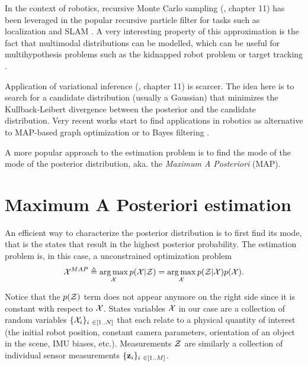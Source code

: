 In the context of robotics, recursive Monte Carlo sampling (\cite{koller2009probabilistic}, chapter 11) has been 
leveraged in the popular recursive particle filter for tasks such as localization \cite{dellaert1999monte} and SLAM \cite{montemerlo2002fastslam}. A very interesting
property of this approximation is the fact that multimodal distributions can be modelled, which can be useful
for multihypothesis problems such as the kidnapped robot problem \cite{dellaert1999monte} or target tracking \cite{gustafsson2002particle}. 

Application of variational inference (\cite{koller2009probabilistic}, chapter 11) is scarcer. The idea here is to search for a candidate distribution 
(usually a Gaussian) that minimizes the Kullback-Leibert divergence between the posterior and the candidate distribution. Very recent works start 
to find applications in robotics as alternative to MAP-based graph optimization \cite{barfoot2020exactly, wong2020variational} 
or to Bayes filtering \cite{lambert2022recursive}. 

A more popular approach to the estimation problem is to find the mode of the mode of the posterior distribution, aka. the \textit{Maximum A Posteriori} (MAP).



\section{Maximum A Posteriori estimation}

An efficient way to characterize the posterior distribution is to first find its mode, that is the states that 
result in the highest posterior probability. The estimation problem is, in this case, a unconstrained optimization problem
%
\begin{equation}
    \label{eq:MAP_pbe}
    \mathcal{X}^{MAP} \triangleq \operatorname*{arg\,max}_{\mathcal{X}} p(\mathcal{X} | \mathcal{Z}) = \operatorname*{arg\,max}_{\mathcal{X}} p(\mathcal{Z} | \mathcal{X}) p(\mathcal{X}).
\end{equation}
%

Notice that the $p(\mathcal{Z})$ term does not appear anymore on the right side since it is constant with respect to $\mathcal{X}$.
States variables $\mathcal{X}$ in our case are a collection of random variables $\{\cX_i\}_{i \in [1..N]}$ that each relate to a physical quantity of 
interest (\eg the initial robot position, constant camera parameters, orientation of an object in the scene, IMU biases, etc.). Measurements $\mathcal{Z}$ are 
similarly a collection of individual sensor measurements $\{\bfz_i\}_{i \in [1..M]}$.

